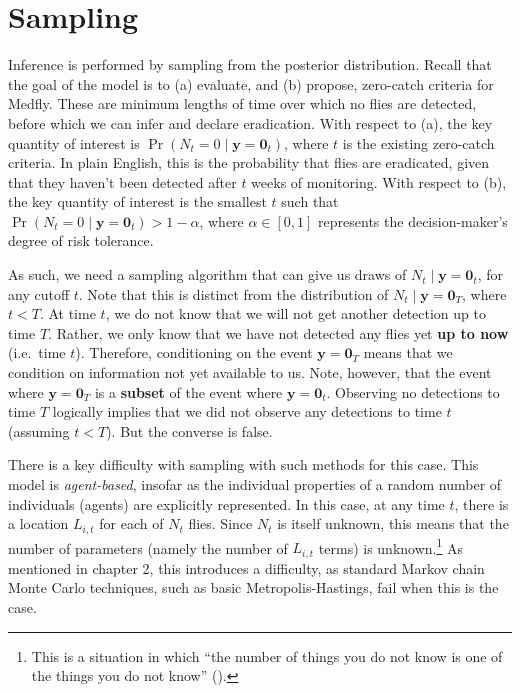 \documentclass[
  oneside]{book}
\begin{document}
\hypertarget{sampling}{%
\section{Sampling}\label{sampling}}

Inference is performed by sampling from the posterior distribution. Recall that the goal of the model is to (a) evaluate, and (b) propose, zero-catch criteria for Medfly. These are minimum lengths of time over which no flies are detected, before which we can infer and declare eradication. With respect to (a), the key quantity of interest is \(\Pr(N_t = 0 \mid \mathbf y = \mathbf 0_t)\), where \(t\) is the existing zero-catch criteria. In plain English, this is the probability that flies are eradicated, given that they haven't been detected after \(t\) weeks of monitoring. With respect to (b), the key quantity of interest is the smallest \(t\) such that \(\Pr(N_t = 0 \mid \mathbf y = \mathbf 0_t) > 1 - \alpha\), where \(\alpha \in [0, 1]\) represents the decision-maker's degree of risk tolerance.

As such, we need a sampling algorithm that can give us draws of \(N_t \mid \mathbf y = \mathbf 0_t\), for any cutoff \(t\). Note that this is distinct from the distribution of \(N_t \mid \mathbf y = \mathbf 0_T\), where \(t<T\). At time \(t\), we do not know that we will not get another detection up to time \(T\). Rather, we only know that we have not detected any flies yet \textbf{up to now} (i.e.~time \(t\)). Therefore, conditioning on the event \(\mathbf y = \mathbf 0_T\) means that we condition on information not yet available to us. Note, however, that the event where \(\mathbf y = \mathbf 0 _T\) is a \textbf{subset} of the event where \(\mathbf y = \mathbf 0_t\). Observing no detections to time \(T\) logically implies that we did not observe any detections to time \(t\) (assuming \(t < T\)). But the converse is false.

There is a key difficulty with sampling with such methods for this case. This model is \emph{agent-based}, insofar as the individual properties of a random number of individuals (agents) are explicitly represented. In this case, at any time \(t\), there is a location \(L_{i,t}\) for each of \(N_t\) flies. Since \(N_t\) is itself unknown, this means that the number of parameters (namely the number of \(L_{i, t}\) terms) is unknown.\footnote{This is a situation in which ``the number of things you do not know is one of the things you do not know'' (\citet{richardson1997bayesian}).} As mentioned in chapter 2, this introduces a difficulty, as standard Markov chain Monte Carlo techniques, such as basic Metropolis-Hastings, fail when this is the case.
\end{document}
